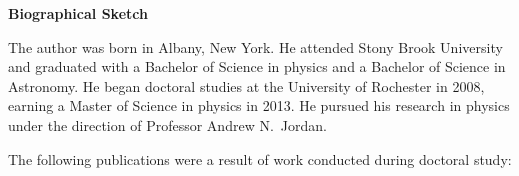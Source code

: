 \clearpage
\thispagestyle{empty}
\begin{center}
  \textbf{Biographical Sketch}
\end{center}

The author was born in Albany, New York.  He attended Stony Brook University and graduated with a Bachelor of Science in physics and a Bachelor of Science in Astronomy.  He began doctoral studies at the University of Rochester in 2008, earning a Master of Science in physics in 2013.  He pursued his research in physics under the direction of Professor Andrew N.~Jordan.

The following publications were a result of work conducted during doctoral study:
\vspace{1cm}



